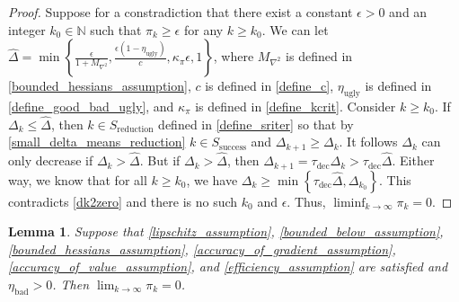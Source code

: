 \documentclass{article}
\newtheorem{lemma}[theorem]{Lemma}
\theoremstyle{case}
\newcommand{\naturals}{{\mathbb N}}
\newcommand{\dk}{{\Delta_k}}
\newcommand{\pik}{{\pi_k}}
\newcommand{\dkpo}{{\Delta_{k+1}}}
\newcommand{\maxhes}{{M_{\nabla^2}}}
\newcommand{\kcrit}{{\kappa_{\pi}}}
\newcommand{\tdec}{{\tau_{\text{dec}}}}
\newcommand{\eugly}{{\eta_{\text{ugly}}}}
\newcommand{\ebad}{{\eta_{\text{bad}}}}
\newcommand{\success}{{S_{\text{success}}}}
\newcommand{\sriter}{{S_{\text{reduction}}}}
\begin{document}
\begin{proof}
Suppose for a constradiction that there exist a constant $\epsilon > 0$ and an integer $k_0 \in \naturals$ such that $\pik \ge \epsilon$ for any $k \ge k_0$.
We can let $\hat \Delta = \min\left\{\frac{\epsilon}{1 + \maxhes}, \frac{\epsilon\left(1 - \eugly\right)}{c}, \kcrit\epsilon, 1 \right\}$,
where
$\maxhes$ is defined in \cref{bounded_hessians_assumption},
$c$ is defined in \cref{define_c},
$\eugly$ is defined in \cref{define_good_bad_ugly},
and $\kcrit$ is defined in \cref{define_kcrit}.
Consider $k \ge k_0$.
If $\dk \le \hat \Delta$, then $k \in \sriter$ defined in \cref{define_sriter} so that by \cref{small_delta_means_reduction} $k \in \success$ and $\dkpo \ge \dk$.
It follows $\dk$ can only decrease if $\dk > \hat \Delta$.
But if $\dk > \hat \Delta$, then $\dkpo = \tdec \dk > \tdec \hat\Delta$.
Either way, we know that for all $k \ge k_0$, we have
$\dk \ge \min\left\{\tdec\hat\Delta, \Delta_{k_0}\right\}$.
This contradicts \cref{dk2zero} and there is no such $k_0$ and $\epsilon$. Thus, $\liminf_{k\to\infty} \pik = 0$.
\end{proof}



\begin{lemma}
\label{strong_convergence}
Suppose that 
\cref{lipschitz_assumption},
\cref{bounded_below_assumption},
\cref{bounded_hessians_assumption},
\cref{accuracy_of_gradient_assumption},
\cref{accuracy_of_value_assumption},
and \cref{efficiency_assumption}
are satisfied and $\ebad > 0$.
Then $\lim_{k\to\infty} \pik = 0$.
\end{lemma}
\end{document}
